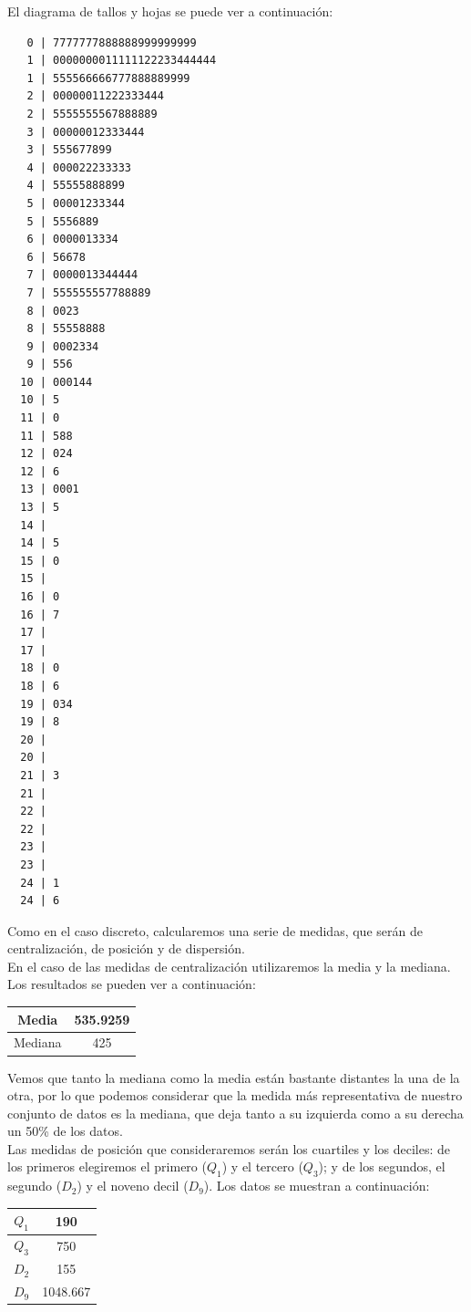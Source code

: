 \documentclass[12pt,a4paper,twoside,openright,titlepage,final]{article}
\begin{document}
El diagrama de tallos y hojas se puede ver a continuación:

\begin{verbatim}
   0 | 7777777888888999999999
   1 | 0000000011111122233444444
   1 | 555566666777888889999
   2 | 00000011222333444
   2 | 5555555567888889
   3 | 00000012333444
   3 | 555677899
   4 | 000022233333
   4 | 55555888899
   5 | 00001233344
   5 | 5556889
   6 | 0000013334
   6 | 56678
   7 | 0000013344444
   7 | 555555557788889
   8 | 0023
   8 | 55558888
   9 | 0002334
   9 | 556
  10 | 000144
  10 | 5
  11 | 0
  11 | 588
  12 | 024
  12 | 6
  13 | 0001
  13 | 5
  14 | 
  14 | 5
  15 | 0
  15 | 
  16 | 0
  16 | 7
  17 | 
  17 | 
  18 | 0
  18 | 6
  19 | 034
  19 | 8
  20 | 
  20 | 
  21 | 3
  21 | 
  22 | 
  22 | 
  23 | 
  23 | 
  24 | 1
  24 | 6

\end{verbatim}

Como en el caso discreto, calcularemos una serie de medidas, que serán de centralización, de posición y de dispersión.\\

En el caso de las medidas de centralización utilizaremos la media y la mediana. Los resultados se pueden ver a continuación:\\

\begin{table}[htbp]
\centering
\begin{tabular}{|c|c|}
\hline Media & 535.9259 \\ 
\hline Mediana & 425 \\ 
\hline 
\end{tabular} 
\end{table}

Vemos que tanto la mediana como la media están bastante distantes la una de la otra, por lo que podemos considerar que la medida más representativa de nuestro conjunto de datos es la mediana, que deja tanto a su izquierda como a su derecha un 50\% de los datos.\\

Las medidas de posición que consideraremos serán los cuartiles y los deciles: de los primeros elegiremos el primero ($Q_1$) y el tercero ($Q_3$); y de los segundos, el segundo ($D_2$) y el noveno decil ($D_9$). Los datos se muestran a continuación:\\

\begin{table}[htbp]
\centering
\begin{tabular}{|c|c|}
\hline $Q_1$ & 190 \\ 
\hline $Q_3$ & 750 \\ 
\hline $D_2$& 155  \\ 
\hline $D_9$& 1048.667  \\ 
\hline 
\end{tabular} 
\end{table}
\end{document}
